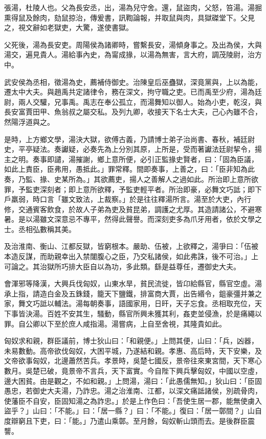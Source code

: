 
\begin{pinyinscope}
張湯，杜陵人也。父為長安丞，出，湯為兒守舍。還，鼠盜肉，父怒，笞湯。湯掘熏得鼠及餘肉，劾鼠掠治，傳爰書，訊鞫論報，并取鼠與肉，具獄磔堂下。父見之，視文辭如老獄吏，大驚，遂使書獄。

父死後，湯為長安吏。周陽侯為諸卿時，嘗繫長安，湯傾身事之。及出為侯，大與湯交，遍見貴人。湯給事內史，為甯成掾，以湯為無害，言大府，調茂陵尉，治方中。

武安侯為丞相，徵湯為史，薦補侍御史。治陳皇后巫蠱獄，深竟黨與，上以為能，遷太中大夫。與趙禹共定諸律令，務在深文，拘守職之吏。已而禹至少府，湯為廷尉，兩人交驩，兄事禹。禹志在奉公孤立，而湯舞知以御人。始為小吏，乾沒，與長安富賈田甲、魚翁叔之屬交私。及列九卿，收接天下名士大夫，己心內雖不合，然陽浮道與之。

是時，上方鄉文學，湯決大獄，欲傅古義，乃請博士弟子治尚書、春秋，補廷尉史，平亭疑法。奏讞疑，必奏先為上分別其原，上所是，受而著讞法廷尉挈令，揚主之明。奏事即譴，湯摧謝，鄉上意所便，必引正監掾史賢者，曰：「固為臣議，如此上責臣，臣弗用，愚抵此。」罪常釋。間即奏事，上善之，曰：「臣非知為此奏，乃監、掾、史某所為。」其欲薦吏，揚人之善解人之過如此。所治即上意所欲罪，予監吏深刻者；即上意所欲釋，予監吏輕平者。所治即豪，必舞文巧詆；即下戶羸弱，時口言「雖文致法，上裁察。」於是往往釋湯所言。湯至於大吏，內行修，交通賓客飲食，於故人子弟為吏及貧昆弟，調護之尤厚。其造請諸公，不避寒暑。是以湯雖文深意忌不專平，然得此聲譽。而深刻吏多為爪牙用者，依於文學之士。丞相弘數稱其美。

及治淮南、衡山、江都反獄，皆窮根本。嚴助、伍被，上欲釋之，湯爭曰：「伍被本造反謀，而助親幸出入禁闥腹心之臣，乃交私諸侯，如此弗誅，後不可治。」上可論之。其治獄所巧排大臣自以為功，多此類。繇是益尊任，遷御史大夫。

會渾邪等降漢，大興兵伐匈奴，山東水旱，貧民流徙，皆卬給縣官，縣官空虛。湯承上指，請造白金及五銖錢，籠天下鹽鐵，排富商大賈，出告緡令，鉏豪彊并兼之家，舞文巧詆以輔法。湯每朝奏事，語國家用，日旰，天子忘食。丞相取充位，天下事皆決湯。百姓不安其生，騷動，縣官所興未獲其利，姦吏並侵漁，於是痛繩以罪。自公卿以下至於庶人咸指湯。湯嘗病，上自至舍視，其隆貴如此。

匈奴求和親，群臣議前，博士狄山曰：「和親便。」上問其便，山曰：「兵，凶器，未易數動。高帝欲伐匈奴，大困平城，乃遂結和親。孝惠、高后時，天下安樂，及文帝欲事匈奴，北邊蕭然苦兵。孝景時，吳楚七國反，景帝往來東宮間，天下寒心數月。吳楚已破，竟景帝不言兵，天下富實。今自陛下興兵擊匈奴，中國以空虛，邊大困貧。由是觀之，不如和親。」上問湯，湯曰：「此愚儒無知。」狄山曰：「臣固愚忠，若御史大夫湯，乃詐忠。湯之治淮南、江都，以深文痛詆諸侯，別疏骨肉，使藩臣不自安，臣固知湯之為詐忠。」於是上作色曰：「吾使生居一郡，能無使虜入盜乎？」山曰：「不能。」曰：「居一縣？」曰：「不能。」復曰：「居一鄣間？」山自度辯窮且下吏，曰：「能。」乃遣山乘鄣。至月餘，匈奴斬山頭而去。是後群臣震讋。


\end{pinyinscope}
